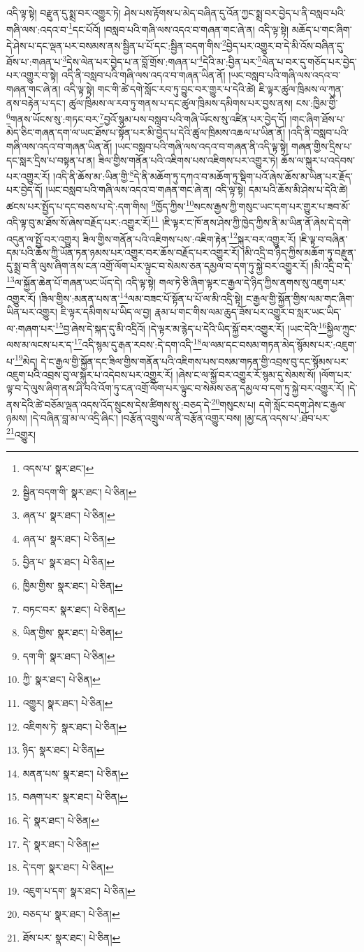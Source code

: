འདི་ལྟ་སྟེ། བརྫུན་དུ་སྨྲ་བར་འགྱུར་ཏེ། ཤེས་པས་རྟོགས་པ་མེད་བཞིན་དུ་འོན་ཀྱང་སྨྲ་བར་བྱེད་པ་ནི་བསླབ་པའི་གཞི་ལས་:འདའ་བ་\footnote{འདས་པ་  སྣར་ཐང་། }དང་པོའོ། །བསླབ་པའི་གཞི་ལས་འདའ་བ་གཞན་གང་ཞེ་ན། འདི་ལྟ་སྟེ། མཆོད་པ་གང་ཞིག་དེ་ཤེས་པ་དང་ལྡན་པར་བསམས་ནས་སྦྱིན་པ་པོ་དང་:སྦྱིན་བདག་གིས་\footnote{སྦྱིན་བདག་གི་  སྣར་ཐང་།  པེ་ཅིན། }བྱེད་པར་འགྱུར་བ་དེ་མི་འོས་བཞིན་དུ་ཐོས་པ་:གཞན་པ་\footnote{ཞན་པ་  སྣར་ཐང་།  པེ་ཅིན། }དེས་ལེན་པར་བྱེད་པ་ན་བློ་གྲོས་:གཞན་པ་\footnote{ཞན་པ་  སྣར་ཐང་།  པེ་ཅིན། }དེའི་མ་:བྱིན་པར་\footnote{བྱིན་པ་  སྣར་ཐང་།  པེ་ཅིན། }ལེན་པ་བར་དུ་གཅོད་པར་བྱེད་པར་འགྱུར་བ་སྟེ། འདི་ནི་བསླབ་པའི་གཞི་ལས་འདའ་བ་གཞན་ཡིན་ནོ། །ཡང་བསླབ་པའི་གཞི་ལས་འདའ་བ་གཞན་གང་ཞེ་ན། འདི་ལྟ་སྟེ། གང་གི་ཚེ་དགེ་སློང་རབ་ཏུ་བྱུང་བར་གྱུར་པ་དེའི་ཚེ། ཇི་ལྟར་ཚུལ་ཁྲིམས་ལ་ཀུན་ནས་བརྟེན་པ་དང་། ཚུལ་ཁྲིམས་ལ་རབ་ཏུ་གནས་པ་དང་ཚུལ་ཁྲིམས་དམིགས་པར་བྱས་ནས། ངས་:ཁྱིམ་གྱི་\footnote{ཁྱིམ་གྱིས་  སྣར་ཐང་།  པེ་ཅིན། }གནས་ཡོངས་སུ་:གཏང་བར་\footnote{བཏང་བར་  སྣར་ཐང་།  པེ་ཅིན། }བྱའོ་སྙམ་པས་བསླབ་པའི་གཞི་ཡོངས་སུ་འཛིན་པར་བྱེད་དོ། །གང་ཞིག་ཐོས་པ་མེད་ཅིང་གཞན་དག་ལ་ཡང་ཐོས་པ་སྟོན་པར་མི་བྱེད་པ་དེའི་ཚུལ་ཁྲིམས་འཆལ་པ་ཡིན་ནོ། །འདི་ནི་བསླབ་པའི་གཞི་ལས་འདའ་བ་གཞན་ཡིན་ནོ། །ཡང་བསླབ་པའི་གཞི་ལས་འདའ་བ་གཞན་ནི་འདི་ལྟ་སྟེ། གཞན་གྱིས་དྲིས་པ་དང་སླར་དྲིས་པ་བསྟན་པ་ན། ཟིལ་གྱིས་གནོན་པའི་འཇིགས་པས་འཇིགས་པར་འགྱུར་ཏེ། ཆོས་ལ་སྐུར་པ་འདེབས་པར་འགྱུར་རོ། །འདི་ནི་ཆོས་མ་:ཡིན་གྱི་\footnote{ཡིན་གྱིས་  སྣར་ཐང་།  པེ་ཅིན། }དེ་ནི་མཆོག་ཏུ་དཀའ་བ་མཆོག་ཏུ་སྡིག་པའོ་ཞེས་ཆོས་མ་ཡིན་པར་རྗོད་པར་བྱེད་དོ། །ཡང་བསླབ་པའི་གཞི་ལས་འདའ་བ་གཞན་གང་ཞེ་ན། འདི་ལྟ་སྟེ། དམ་པའི་ཆོས་མི་ཤེས་པ་དེའི་ཚེ། ཚངས་པར་སྤྱོད་པ་དང་བཅས་པ་དེ་:དག་གིས། \footnote{དག་གི་  སྣར་ཐང་།  པེ་ཅིན། }ཁྱོད་ཀྱིས་\footnote{ཀྱི་  སྣར་ཐང་།  པེ་ཅིན། }སངས་རྒྱས་ཀྱི་གསུང་ཡང་དག་པར་གྱུར་པ་ཟབ་མོ་འདི་ལྟ་བུ་མ་ཐོས་སོ་ཞེས་བརྗོད་པར་:འགྱུར་རོ།\footnote{འགྱུར།  སྣར་ཐང་།  པེ་ཅིན། } །ཇི་ལྟར་ང་ཁོ་ནས་ཤེས་ཀྱི་ཁྱེད་ཀྱིས་ནི་མ་ཡིན་ནོ་ཞེས་དེ་དགེ་འདུན་ལ་སྤྱོ་བར་འགྱུར། ཟིལ་གྱིས་གནོན་པའི་འཇིགས་པས་:འཇིག་རྟེན་\footnote{འཇིགས་ཏེ་  སྣར་ཐང་།  པེ་ཅིན། }སྐུར་བར་འགྱུར་རོ། །ཇི་ལྟ་བ་བཞིན་དམ་པའི་ཆོས་ཀྱི་ཡོན་ཏན་ཉམས་པར་འགྱུར་བར་ཆོས་བརྗོད་པར་འགྱུར་རོ། །མི་འདྲི་བ་ཉིད་ཀྱིས་མཆོག་ཏུ་བརྫུན་དུ་སྨྲ་བ་ནི་ལུས་ཞིག་ནས་ངན་འགྲོ་ལོག་པར་ལྟུང་བ་སེམས་ཅན་དམྱལ་བ་དག་ཏུ་སྐྱེ་བར་འགྱུར་རོ། །མི་འདྲི་བ་དེ་\footnote{ཉིད་  སྣར་ཐང་།  པེ་ཅིན། }ལ་སྐྱོན་ཆེན་པོ་གཞན་ཡང་ཡོད་དེ། འདི་ལྟ་སྟེ། གལ་ཏེ་ཅི་ཞིག་ལྟར་ང་རྒྱལ་དེ་ཉིད་ཀྱིས་ནགས་སུ་འཇུག་པར་འགྱུར་རོ། །ཟིལ་གྱིས་:མནན་པས་ན་\footnote{མནན་པས་  སྣར་ཐང་།  པེ་ཅིན། }ལམ་བཟང་པོ་སྟོན་པ་པོ་ལ་མི་འདྲི་སྟེ། ང་རྒྱལ་གྱི་སྐྱོན་གྱིས་ལམ་གང་ཞིག་ཡིན་པར་འགྱུར། ཇི་ལྟར་དམིགས་པ་ཡིད་ལ་བྱ། རྣམ་པ་གང་གིས་ལམ་ཆུད་ཟོས་པར་འགྱུར་བ་སླར་ཡང་ཡིད་ལ་:གཞག་པར་\footnote{བཞག་པར་  སྣར་ཐང་།  པེ་ཅིན། }བྱ་ཞེས་དེ་སྐད་དུ་མི་འདྲིའོ། །དེ་ལྟར་མ་རྙེད་པ་དེའི་ཡིད་སྐྱོ་བར་འགྱུར་རོ། །ཡང་དེའི་\footnote{དེ་  སྣར་ཐང་།  པེ་ཅིན། }སྐྱིལ་ཀྲུང་ལས་མ་ལངས་པར་ད་\footnote{དེ་  སྣར་ཐང་།  པེ་ཅིན། }འདི་སྙམ་དུ་རྒན་རབས་:དེ་དག་འདི་\footnote{དེ་དག་  སྣར་ཐང་།  པེ་ཅིན། }ལ་ལམ་དང་བསམ་གཏན་མེད་སྙོམས་པར་:འཇུག་པ་\footnote{འཇུག་པ་དག་  སྣར་ཐང་།  པེ་ཅིན། }མེད། དེ་ང་རྒྱལ་གྱི་སྐྱོན་དང་ཟིལ་གྱིས་གནོན་པའི་འཇིགས་པས་བསམ་གཏན་གྱི་འབྲས་བུ་དང་སྙོམས་པར་འཇུག་པའི་འབྲས་བུ་ལ་སྐུར་པ་འདེབས་པར་འགྱུར་རོ། །ཞེས་ང་ལ་སྐྱོ་བར་འགྱུར་རོ་སྙམ་དུ་སེམས་སོ། །ལོག་པར་ལྟ་བ་དེ་ལུས་ཞིག་ནས་ཤི་བའི་འོག་ཏུ་ངན་འགྲོ་ལོག་པར་ལྟུང་བ་སེམས་ཅན་དམྱལ་བ་དག་ཏུ་སྐྱེ་བར་འགྱུར་རོ། །དེ་ནས་དེའི་ཚེ་བཅོམ་ལྡན་འདས་འོད་སྲུངས་དེས་ཚིགས་སུ་:བཅད་དེ་\footnote{བཅད་པ་  སྣར་ཐང་།  པེ་ཅིན། }གསུངས་པ། དགེ་སློང་བདག་ཤེས་ང་རྒྱལ་ཉམས། །དེ་བཞིན་བླ་མ་ལ་འདྲི་ཞིང་། །བརྩོན་འགྲུས་ལ་ནི་བརྩོན་འགྱུར་བས། །མྱ་ངན་འདས་པ་:ཐོབ་པར་\footnote{ཐོས་པར་  སྣར་ཐང་།  པེ་ཅིན། }འགྱུར། 